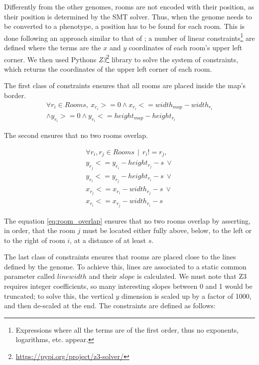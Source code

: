Differently from the other genomes, rooms are not encoded with their position, as their position is determined by the SMT solver. Thus, when the genome needs to be converted to a phenotype, a position has to be found for each room. This is done following an approach similar to that of \citet{whitehead_spatial_2020}; a number of linear constraints\footnote{Expressions where all the terms are of the first order, thus no exponents, logarithms, etc. appear.} are defined where the terms are the $x$ and $y$ coordinates of each room's upper left corner. We then used Pythons \textit{Z3}\footnote{\url{https://pypi.org/project/z3-solver/}} library to solve the system of constraints, which returns the coordinates of the upper left corner of each room.

The first class of constraints ensures that all rooms are placed inside the map's border. 
\begin{equation}
    \begin{split}
            \forall r_i \in Rooms,\: x_{r_i} >= 0 \land x_{r_i} <= width_{map} - width_{r_i} \\ \land y_{r_i} >= 0 \land y_{r_i} <= height_{map} - height_{r_i}
    \end{split}
\end{equation}

The second ensures that no two rooms overlap.

\begin{equation}
\label{eq:room_overlap}
    \begin{split}
        \forall r_i, r_j \in Rooms\, \mid\,  r_i != r_j, \\
        y_{r_j} <= y_{r_i} - height_{r_j} - s\: \lor \\
        y_{r_i} <= y_{r_j} - height_{r_i} - s\: \lor \\
        x_{r_j} <= x_{r_i} - width_{r_j} - s\: \lor \\
        x_{r_i} <= x_{r_j} - width_{r_i} - s
    \end{split}
\end{equation}

The equation \cref{eq:room_overlap} ensures that no two rooms overlap by asserting, in order, that the room $j$ must be located either fully above, below, to the left or to the right of room $i$, at a distance of at least $s$.

The last class of constraints ensures that rooms are placed close to the lines defined by the genome. To achieve this, lines are associated to a static common parameter called $linewidth$ and their $slope$ is calculated. We must note that Z3 requires integer coefficients, so many interesting slopes between 0 and 1 would be truncated; to solve this, the vertical $y$ dimension is scaled up by a factor of 1000, and then de-scaled at the end. The constraints are defined as follows:

